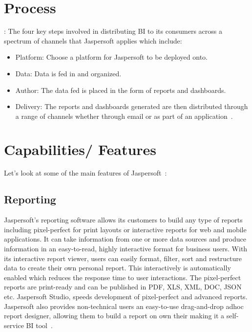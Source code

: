 \section{Process}:
The four key steps involved in distributing BI to its consumers across a
spectrum of channels that Jaspersoft applies which include:
\begin{itemize} \item Platform: Choose a platform for Jaspersoft to be deployed onto.
\item Data: Data is fed in and organized. 
\item Author: The data fed is placed in the form of reports and dashboards.
\item Delivery: The reports and dashboards generated are then distributed
through a range of channels whether through email or as part of an
application~\cite{hid-sp18-516-www-quick-start-video}. \end{itemize}


\section{Capabilities/ Features}
Let's look at some of the main features of
Jaspersoft~\cite{hid-sp18-516-www-jaspersoft-features}:

\subsection{Reporting}
Jaspersoft's reporting software allows its customers to build any type of
reports including pixel-perfect for print layouts or interactive reports for web
and mobile applications. It can take information from one or more data sources
and produce information in an easy-to-read, highly interactive format for
business users. With its interactive report viewer, users can easily format,
filter, sort and restructure data to create their own personal report. This
interactively is automatically enabled which reduces the response time to user
interactions. The pixel-perfect reports are print-ready and can be published in
PDF, XLS, XML, DOC, JSON etc. Jaspersoft Studio, speeds development of
pixel-perfect and advanced reports. Jaspersoft also provides non-technical users
an easy-to-use drag-and-drop adhoc report designer, allowing them to build a
report on own their making it a self-service BI
tool~\cite{hid-sp18-516-www-jaspersoft-reporting-software}. 

